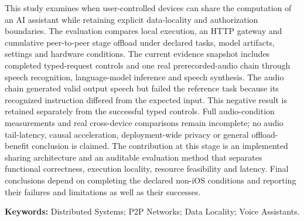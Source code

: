 This study examines when user-controlled devices can share the computation of an AI assistant while retaining explicit data-locality and authorization boundaries. The evaluation compares local execution, an HTTP gateway and cumulative peer-to-peer stage offload under declared tasks, model artifacts, settings and hardware conditions. The current evidence snapshot includes completed typed-request controls and one real prerecorded-audio chain through speech recognition, language-model inference and speech synthesis. The audio chain generated valid output speech but failed the reference task because its recognized instruction differed from the expected input. This negative result is retained separately from the successful typed controls. Full audio-condition measurements and real cross-device comparisons remain incomplete; no audio tail-latency, causal acceleration, deployment-wide privacy or general offload-benefit conclusion is claimed. The contribution at this stage is an implemented sharing architecture and an auditable evaluation method that separates functional correctness, execution locality, resource feasibility and latency. Final conclusions depend on completing the declared non-iOS conditions and reporting their failures and limitations as well as their successes.

\textbf{Keywords:} Distributed Systems; P2P Networks; Data Locality; Voice Assistants.
